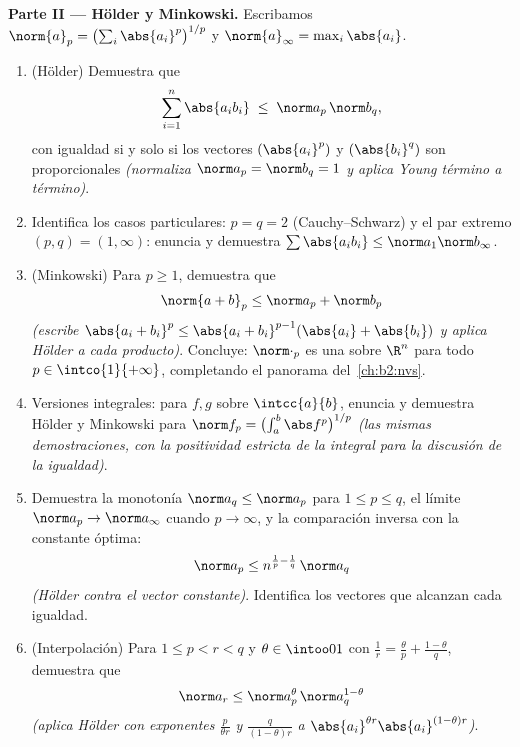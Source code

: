 \begin{problem}
\medskip
\noindent\textbf{Parte II --- Hölder y Minkowski.} Escribamos
$\norm{a}_p = \bigl(\sum_i \abs{a_i}^p\bigr)^{1/p}$ y
$\norm{a}_\infty = \max_i\abs{a_i}$.
\begin{enumerate}[resume]
  \item (Hölder) Demuestra que
        \[
        \sum_{i=1}^{n}\abs{a_ib_i} \;\leq\;
        \norm a_p\,\norm b_q ,
        \]
        con igualdad si y solo si los vectores $(\abs{a_i}^p)$ y
        $(\abs{b_i}^q)$ son proporcionales \emph{(normaliza $\norm
        a_p = \norm b_q = 1$ y aplica Young término a término)}.
  \item Identifica los casos particulares: $p = q = 2$
        (Cauchy--Schwarz) y el par extremo $(p, q) = (1, \infty)$:
        enuncia y demuestra $\sum\abs{a_ib_i} \leq \norm
        a_1\norm b_\infty$.
  \item (Minkowski) Para $p \geq 1$, demuestra que
        \[
        \norm{a + b}_p \leq \norm a_p + \norm b_p
        \]
        \emph{(escribe $\abs{a_i + b_i}^p \leq \abs{a_i +
        b_i}^{p-1}(\abs{a_i} + \abs{b_i})$ y aplica Hölder a cada
        producto)}. Concluye: $\norm\cdot_p$ es una  sobre
        $\R^n$ para todo $p \in \intco{1}{+\infty}$, completando el
        panorama del~\cref{ch:b2:nvs}.
  \item Versiones integrales: para $f, g$  sobre
        $\intcc{a}{b}$, enuncia y demuestra Hölder y Minkowski para
        $\norm f_p = \bigl(\int_a^b\abs f^p\bigr)^{1/p}$ \emph{(las
        mismas demostraciones, con la positividad estricta de la
        integral para la discusión de la igualdad)}.
  \item Demuestra la monotonía $\norm a_q \leq \norm a_p$ para $1
        \leq p \leq q$, el límite $\norm a_p \to \norm a_\infty$
        cuando $p \to \infty$, y la comparación inversa con la
        constante óptima:
        \[
        \norm a_p \leq n^{\frac1p - \frac1q}\,\norm a_q
        \]
        \emph{(Hölder contra el vector constante)}. Identifica los
        vectores que alcanzan cada igualdad.
  \item (Interpolación) Para $1 \leq p < r < q$ y $\theta \in
        \intoo01$ con $\frac1r = \frac\theta p + \frac{1-\theta}q$,
        demuestra que
        \[
        \norm a_r \leq \norm a_p^{\theta}\,
        \norm a_q^{1-\theta}
        \]
        \emph{(aplica Hölder con exponentes $\frac{p}{\theta r}$ y
        $\frac{q}{(1-\theta)r}$ a $\abs{a_i}^{\theta
        r}\abs{a_i}^{(1-\theta)r}$)}.
\end{enumerate}


\end{problem}
